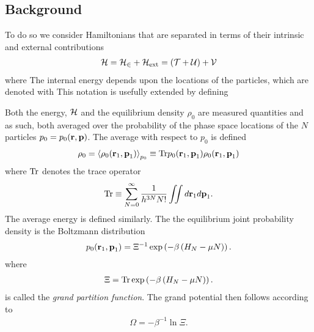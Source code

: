 {\subsection{Background}
To do so we consider Hamiltonians that are separated in terms of their intrinsic and external contributions
\begin{align}
  {\cal H} =  {\cal H}_\in + {\cal H}_{\text{ext}} = \left( {\cal{T}} + {\cal{U}} \right) + {\cal{V}}
\end{align}
where 
The internal energy depends upon the  locations of the particles, which are denoted  with
This notation is usefully extended by defining 

Both the energy, ${\cal H}$ and the equilibrium  density $\rho_0$ are measured quantities
and as such, both  averaged over the probability of the phase space locations of the $N$ particles $p_0 = p_0({\mathbf{\textbf{r}}},{\mathbf{\textbf{p}}})$.
The average with respect to $p_0$ is defined
\begin{align}
  \rho_0 =  \left< \rho_0({\mathbf{\textbf{r}}}_1, {\mathbf{\textbf{p}}}_1)  \right>_{p_0} \equiv \textrm{Tr} p_0({\mathbf{\textbf{r}}}_1, {\mathbf{\textbf{p}}}_1) \rho_0({\mathbf{\textbf{r}}}_1, {\mathbf{\textbf{p}}}_1) 
\end{align}
where $\textrm{Tr}$ denotes the trace operator
\begin{align}
  \textrm{Tr} \equiv \sum_{N=0}^\infty \frac{1}{h^{3N}N!} \iint d{\mathbf{\textbf{r}}}_1 d{\mathbf{\textbf{p}}}_1.
\end{align}
The average energy is defined similarly.
The the equilibrium 
joint 
 probability density  is  the Boltzmann distribution 
\begin{align}
  p_0({\mathbf{\textbf{r}}}_1, {\mathbf{\textbf{p}}}_1) = \Xi^{-1} \exp\left( -\beta \left( H_N - \mu N \right) \right).
\end{align}
where 
\begin{align}
  \Xi = \textrm{Tr} \exp\left( -\beta \left( H_N - \mu N \right) \right). \label{eqn:nuc:GPF}
\end{align}
is called the {\em grand partition function}.
The grand potential then follows according to 
\begin{align}
  \Omega = -\beta^{-1}\ln \Xi.
\end{align}

}
